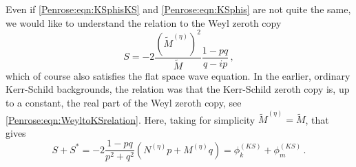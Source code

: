 Even if \eqref{Penrose:eqn:KSphisKS} and \eqref{Penrose:eqn:KSphis} are not quite the same, we would like to understand the relation to the Weyl zeroth copy
\begin{equation}
S = -2 \frac{(\tilde{M}^{(\eta)})^2}{\tilde{M}} \frac{1-pq}{q-ip} \, ,
\end{equation}
which of course also satisfies the flat space wave equation. In the earlier, ordinary Kerr-Schild backgrounds, the relation was that the Kerr-Schild zeroth copy is, up to a constant, the real part of the Weyl zeroth copy, see  \eqref{Penrose:eqn:WeyltoKSrelation}. Here, taking for simplicity $\tilde{M}^{(\eta)} = \tilde{M}$, that gives
\begin{equation}
S + S^* = -2 \frac{1-pq}{p^2 + q^2}(N^{(\eta)} p + M^{(\eta)} q) = \phi^{(KS)}_k + \phi^{(KS)}_m \, .
\end{equation}
